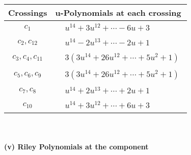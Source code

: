 \documentclass[1p]{elsarticle_modified}
\theoremstyle{definition}
\begin{document}
\begin{tabular}{m{50pt}|m{274pt}}
Crossings & \hspace{64pt}u-Polynomials at each crossing \\
\hline $$\begin{aligned}c_{1}\end{aligned}$$&$\begin{aligned}
&u^{14}+3 u^{12}+\cdots-6 u+3
\end{aligned}$\\
\hline $$\begin{aligned}c_{2},c_{12}\end{aligned}$$&$\begin{aligned}
&u^{14}-2 u^{13}+\cdots-2 u+1
\end{aligned}$\\
\hline $$\begin{aligned}c_{3},c_{4},c_{11}\end{aligned}$$&$\begin{aligned}
&3(3 u^{14}+26 u^{12}+\cdots+5 u^2+1)
\end{aligned}$\\
\hline $$\begin{aligned}c_{5},c_{6},c_{9}\end{aligned}$$&$\begin{aligned}
&3(3 u^{14}+26 u^{12}+\cdots+5 u^2+1)
\end{aligned}$\\
\hline $$\begin{aligned}c_{7},c_{8}\end{aligned}$$&$\begin{aligned}
&u^{14}+2 u^{13}+\cdots+2 u+1
\end{aligned}$\\
\hline $$\begin{aligned}c_{10}\end{aligned}$$&$\begin{aligned}
&u^{14}+3 u^{12}+\cdots+6 u+3
\end{aligned}$\\
\hline
\end{tabular}\\~\\
\newpage\renewcommand{\arraystretch}{1}
\flushleft \textbf{(v) Riley Polynomials at the component}\newline \\
\end{document}
